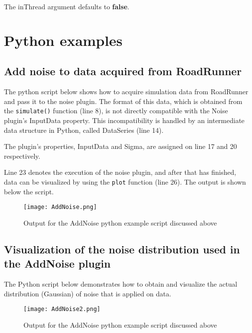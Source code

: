 The inThread argument defaults to \textbf{false}.

\section{Python examples}

\subsection{Add noise to data acquired from RoadRunner}
The python script below shows how to acquire simulation data from RoadRunner and pass it to the noise plugin. The format of this data, which is obtained from the \verb|simulate()| function (line 8), is not directly compatible with the Noise plugin's InputData property. This incompatibility is handled by an intermediate data structure in Python, called DataSeries (line 14).

The plugin's properties, InputData and Sigma, are assigned on line 17 and 20 respectively.

Line 23 denotes the execution of the noise plugin, and after that has finished, data can be visualized by using the \verb|plot| function (line 26). The output is shown below the script.

\begin{singlespace}

\end{singlespace}

\begin{figure}[ht]
\centering
\texttt{[image: AddNoise.png]}
\caption{Output for the AddNoise python example script discussed above}
\label{fig:addNoiseFig1}
\end{figure}

\subsection{Visualization of the noise distribution used in the AddNoise plugin}
The Python script below demonstrates how to obtain and visualize the actual distribution (Gaussian) of noise that is applied on data.

\begin{singlespace}

\end{singlespace}

\begin{figure}[ht]
\centering
\texttt{[image: AddNoise2.png]}
\caption{Output for the AddNoise python example script discussed above}
\label{fig:addNoiseFig2}
\end{figure}
